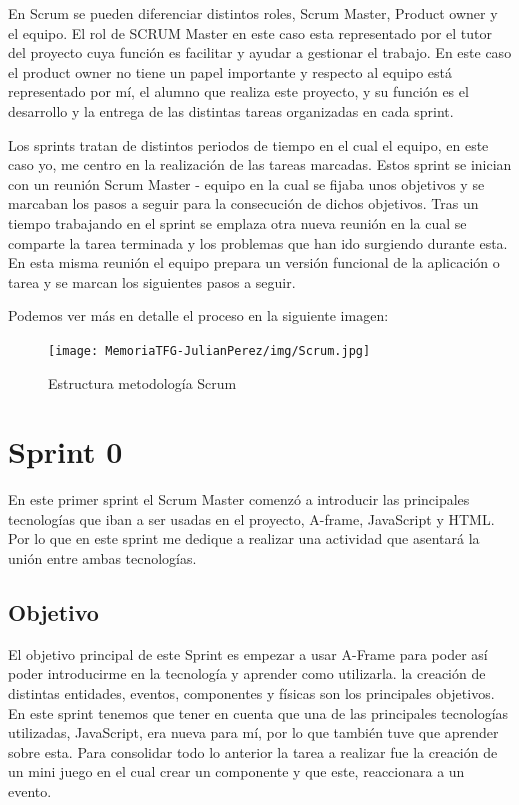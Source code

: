 \documentclass[a4paper, 12pt]{book}
\begin{document}
En Scrum se pueden diferenciar distintos roles, Scrum Master, Product owner y el equipo. El rol de SCRUM Master en este caso esta representado por el tutor del proyecto cuya función es facilitar y ayudar a gestionar el trabajo. En este caso el product owner no tiene un papel importante y respecto al equipo está representado por mí, el alumno que realiza este proyecto, y su función es el desarrollo y la entrega de las distintas tareas organizadas en cada sprint.

Los sprints tratan de distintos periodos de tiempo en el cual el equipo, en este caso yo, me centro en la realización de las tareas marcadas. Estos sprint se inician con un reunión Scrum Master - equipo en la cual se fijaba unos objetivos y se marcaban los pasos a seguir para la consecución de dichos objetivos. Tras un tiempo trabajando en el sprint se emplaza otra nueva reunión en la cual se comparte la tarea terminada y los problemas que han ido surgiendo durante esta. En esta misma reunión el equipo prepara un versión funcional de la aplicación o tarea y se marcan los siguientes pasos a seguir. 

Podemos ver más en detalle el proceso en la siguiente imagen:
\begin{figure}[H]
  \centering
  \texttt{[image: MemoriaTFG-JulianPerez/img/Scrum.jpg]}
  \caption{Estructura metodología Scrum}\label{scrum}
\end{figure}

\section{Sprint 0} %
\label{sec:sprint0}
En este primer sprint el Scrum Master comenzó a introducir las principales tecnologías que iban a ser usadas en el proyecto, A-frame, JavaScript y HTML. Por lo que en este sprint me dedique a realizar una actividad que asentará la unión entre ambas tecnologías.

\subsection{Objetivo}
El objetivo principal de este Sprint es empezar a usar A-Frame para poder así poder introducirme en la tecnología y aprender como utilizarla. la creación de distintas entidades, eventos, componentes y físicas son los principales objetivos. En este sprint tenemos que tener en cuenta que una de las principales tecnologías utilizadas, JavaScript, era nueva para mí, por lo que también tuve que aprender sobre esta. Para consolidar todo lo anterior la tarea a realizar fue la creación de un mini juego en el cual crear un componente y que este, reaccionara a un evento.
\end{document}

